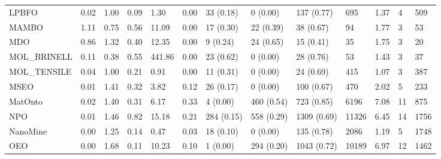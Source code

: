 \begin{table}
\begin{tabular}{m{3.5cm}m{2cm}m{2cm}m{2cm}m{2cm}m{2cm}m{2cm}m{2cm}m{2cm}m{2cm}m{2cm}m{2cm}m{2cm}}
LPBFO                   &                0.02 &                  1.00 &                   0.09 &               1.30 &               0.00 &   33 (0.18) &    0 (0.00) &   137 (0.77) &             695 &     1.37 &          4 &               509 \\
MAMBO                   &                1.11 &                  0.75 &                   0.56 &              11.09 &               0.00 &   17 (0.30) &   22 (0.39) &    38 (0.67) &              94 &     1.77 &          3 &                53 \\
MDO                     &                0.86 &                  1.32 &                   0.40 &              12.35 &               0.00 &    9 (0.24) &   24 (0.65) &    15 (0.41) &              35 &     1.75 &          3 &                20 \\
MOL\_BRINELL             &                0.11 &                  0.38 &                   0.55 &             441.86 &               0.00 &   23 (0.62) &    0 (0.00) &    28 (0.76) &              53 &     1.43 &          3 &                37 \\
MOL\_TENSILE             &                0.04 &                  1.00 &                   0.21 &               0.91 &               0.00 &   11 (0.31) &    0 (0.00) &    24 (0.69) &             415 &     1.07 &          3 &               387 \\
MSEO                    &                0.01 &                  1.41 &                   0.32 &               3.82 &               0.12 &   26 (0.17) &    0 (0.00) &   100 (0.67) &             470 &     2.02 &          5 &               233 \\
MatOnto                 &                0.02 &                  1.40 &                   0.31 &               6.17 &               0.33 &    4 (0.00) &  460 (0.54) &   723 (0.85) &            6196 &     7.08 &         11 &               875 \\
NPO                     &                0.01 &                  1.46 &                   0.82 &              15.18 &               0.21 &  284 (0.15) &  558 (0.29) &  1309 (0.69) &           11326 &     6.45 &         14 &              1756 \\
NanoMine                &                0.00 &                  1.25 &                   0.14 &               0.47 &               0.03 &   18 (0.10) &    0 (0.00) &   135 (0.78) &            2086 &     1.19 &          5 &              1748 \\
OEO                     &                0.00 &                  1.68 &                   0.11 &              10.23 &               0.10 &    1 (0.00) &  294 (0.20) &  1043 (0.72) &           10189 &     6.97 &         12 &              1462 \\

\end{tabular}
\end{table}
